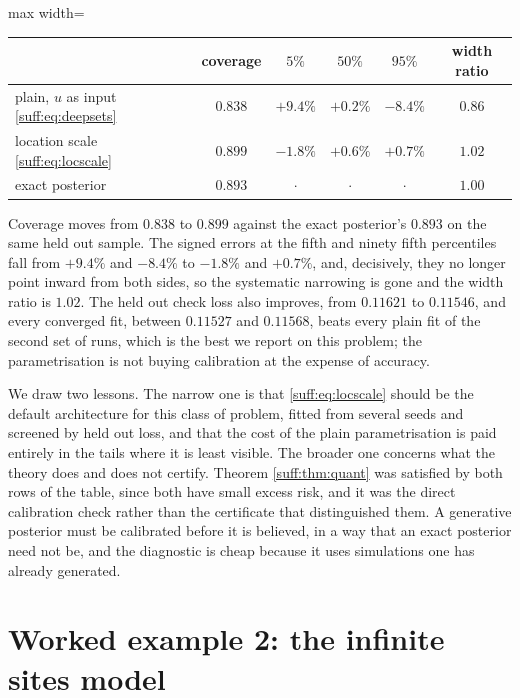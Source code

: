 \begin{center}
\begin{adjustbox}{max width=\textwidth}
\begin{tabular}{lccccc}
\toprule
& coverage & $5\%$ & $50\%$ & $95\%$ & width ratio \\
\midrule
plain, $u$ as input \eqref{suff:eq:deepsets} & $0.838$ & $+9.4\%$ & $+0.2\%$ & $-8.4\%$ & $0.86$ \\
location scale \eqref{suff:eq:locscale}      & $0.899$ & $-1.8\%$  & $+0.6\%$ & $+0.7\%$ & $1.02$ \\
exact posterior                          & $0.893$ & $\cdot$ & $\cdot$ & $\cdot$ & $1.00$ \\
\bottomrule
\end{tabular}
\end{adjustbox}
\end{center}

Coverage moves from $0.838$ to $0.899$ against the exact posterior's $0.893$ on the same held
out sample. The signed errors at the fifth and ninety fifth percentiles fall from $+9.4\%$
and $-8.4\%$ to $-1.8\%$ and $+0.7\%$, and, decisively, they no longer point inward from both
sides, so the systematic narrowing is gone and the width ratio is $1.02$. The held out check
loss also improves, from $0.11621$ to $0.11546$, and every converged fit, between $0.11527$ and
$0.11568$, beats every plain fit of the second set of runs, which is the best we report on
this problem; the parametrisation is not buying calibration at the expense of accuracy.

We draw two lessons. The narrow one is that \eqref{suff:eq:locscale} should be the default
architecture for this class of problem, fitted from several seeds and screened by held out
loss, and that the cost of the plain parametrisation is paid entirely in the tails where it is
least visible. The broader one concerns what the
theory does and does not certify. Theorem \ref{suff:thm:quant} was satisfied by both rows of
the table, since both have small excess risk, and it was the direct calibration check rather
than the certificate that distinguished them. A generative posterior must be calibrated before
it is believed, in a way that an exact posterior need not be, and the diagnostic is cheap
because it uses simulations one has already generated.

\section{Worked example 2: the infinite sites model}
\label{suff:sec:sites}

